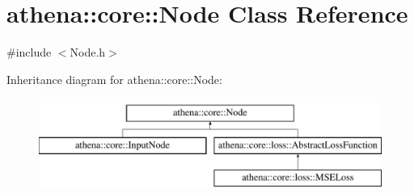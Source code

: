 \hypertarget{classathena_1_1core_1_1_node}{}\section{athena\+:\+:core\+:\+:Node Class Reference}
\label{classathena_1_1core_1_1_node}


{\ttfamily \#include $<$Node.\+h$>$}

Inheritance diagram for athena\+:\+:core\+:\+:Node\+:\begin{figure}[H]
\begin{center}
\leavevmode
\includegraphics[height=3.000000cm]{d9/dbb/classathena_1_1core_1_1_node}
\end{center}
\end{figure}
